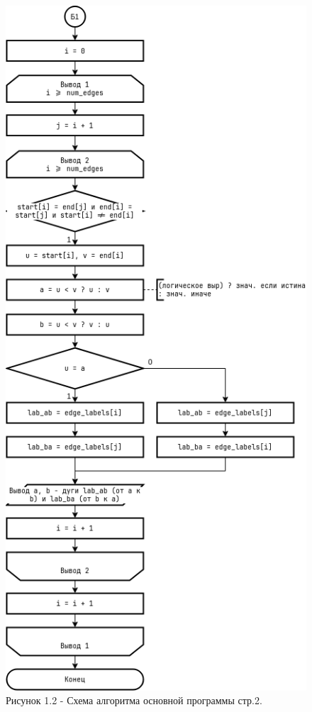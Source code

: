 \documentclass[oneside,a4paper,14pt]{extarticle}
\begin{document}
\clearpage
\begin{figure}[H]
	\centering
	\includegraphics[height=0.9\textheight]{pics/flowchart2.png}
	\caption*{Рисунок 1.2 - Схема алгоритма основной программы стр.2.}
\end{figure}
\end{document}

